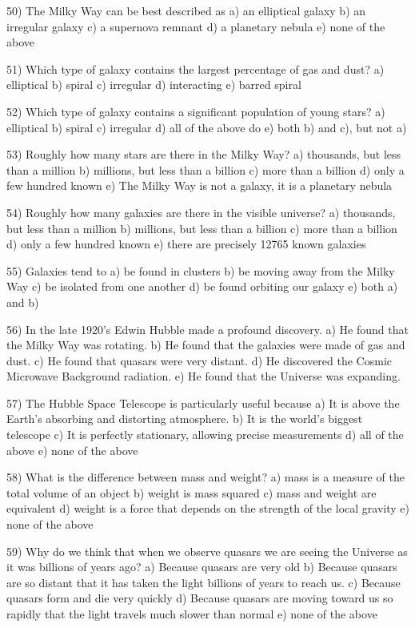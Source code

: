 50) The Milky Way can be best described as
a) an elliptical galaxy b) an irregular galaxy c) a supernova remnant
d) a planetary nebula e) none of the above

51) Which type of galaxy contains the largest percentage of gas and dust?
a) elliptical b) spiral c) irregular d) interacting e) barred spiral

52) Which type of galaxy contains a significant population of young stars?
a) elliptical b) spiral c) irregular d) all of the above do
e) both b) and c), but not a)

53) Roughly how many stars are there in the Milky Way?
a) thousands, but less than a million
b) millions, but less than a billion
c) more than a billion
d) only a few hundred known
e) The Milky Way is not a galaxy, it is a planetary nebula

54) Roughly how many galaxies are there in the visible universe?
a) thousands, but less than a million
b) millions, but less than a billion
c) more than a billion
d) only a few hundred known
e) there are precisely 12765 known galaxies

55) Galaxies tend to
a) be found in clusters
b) be moving away from the Milky Way
c) be isolated from one another
d) be found orbiting our galaxy
e) both a) and b)

56) In the late 1920's Edwin Hubble made a profound discovery.
a) He found that the Milky Way was rotating.
b) He found that the galaxies were made of gas and dust.
c) He found that quasars were very distant.
d) He discovered the Cosmic Microwave Background radiation.
e) He found that the Universe was expanding.

57) The Hubble Space Telescope is particularly useful because
a) It is above the Earth's absorbing and distorting atmosphere.
b) It is the world's biggest telescope
c) It is perfectly stationary, allowing precise measurements
d) all of the above
e) none of the above

58) What is the difference between mass and weight?
a) mass is a measure of the total volume of an object
b) weight is mass squared
c) mass and weight are equivalent
d) weight is a force that depends on the strength of the local gravity
e) none of the above

59) Why do we think that when we observe quasars we are seeing the Universe
as it was billions of years ago?
a) Because quasars are very old
b) Because quasars are so distant that it has taken the light billions
of years to reach us.
c) Because quasars form and die very quickly
d) Because quasars are moving toward us so rapidly that the light travels
much slower than normal
e) none of the above

